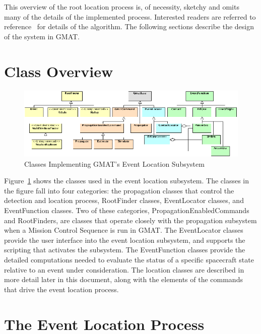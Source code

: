 \documentclass[letterpaper,10pt]{article}
\begin{document}
This overview of the root location process is, of necessity, sketchy and omits
many of the details of the implemented process.  Interested readers are
referred to reference~\cite{aasastro} for details of the algorithm.  The
following sections describe the design of the system in GMAT.

\section{Class Overview}

\begin{figure}
\begin{center}
\includegraphics[scale=2.0]{./Images/EventLocationClasses.eps}
\caption{\label{fig:EventClasses}Classes Implementing GMAT's Event Location
Subsystem}
\end{center}
\end{figure} 

Figure~\ref{fig:EventClasses} shows the classes used in the event location
subsystem.  The classes in the figure fall into four categories: the 
propagation classes that control the detection and location process, RootFinder
classes, EventLocator classes, and EventFunction classes.  Two of these
categories, PropagationEnabledCommands and RootFinders, are classes that operate
closely with the propagation subsystem when a Mission Control Sequence is run in
GMAT.  The EventLocator classes provide the user interface into the event
location subsystem, and supports the scripting that activates the subsystem. 
The EventFunction classes provide the detailed computations needed to evaluate
the status of a specific spacecraft state relative to an event under
consideration.  The location classes are described in more detail later in this
document, along with the elements of the commands that drive the event location
process. 

\section{The Event Location Process} 
\end{document}
